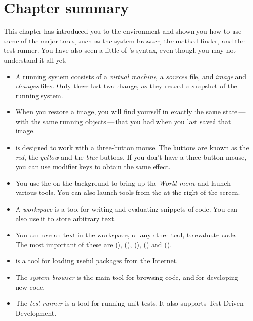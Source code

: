 \documentclass[a4paper,10pt,twoside]{book}
\begin{document}
\section{Chapter summary}
This chapter has introduced you to the \sq environment and shown you how to use some of the major tools, such as the system browser, the method finder, and the test runner.   You have also seen a little of \sq's syntax, even though you may not understand it all yet.

\begin{itemize}
  \item A running \sq system consists of a \emph{virtual machine}, a \emph{sources} file, and \emph{image} and \emph{changes} files. Only these last two change, as they record a snapshot of the running system.
  \item When you restore a \sq image, you will find yourself in exactly the same state\,---\,with the same running objects\,---\,that you had when you last saved that image.
  \item \sq is designed to work with a three-button mouse. The buttons are known as the \emph{red}, the \emph{yellow} and the \emph{blue} buttons. If you don't have a three-button mouse, you can use modifier keys to obtain the same effect.
  \item You use the  on the \sq background to bring up the \emph{World menu} and launch various tools. You can also launch tools from the \toolsflapind at the right of the \sq screen.
  \item A \emph{workspace} is a tool for writing and evaluating snippets of code. You can also use it to store arbitrary text.
  \item You can use  on text in the workspace, or any other tool, to evaluate code. The most important of these are  (),  (),  (),  () and  ().
  \item \sqmap is a tool for loading useful packages from the Internet.
  \item The \emph{system browser} is the main tool for browsing \sq code, and for developing new code.
  \item The \emph{test runner} is a tool for running unit tests. It also supports Test Driven Development.
\end{itemize}

\ifx\wholebook\relax\else 
   
   
\end{document}
